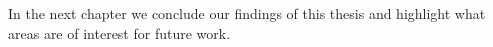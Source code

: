 In the next chapter we conclude our findings of this thesis and highlight what
areas are of interest for future work.

%
%
%
%
%
%
%
